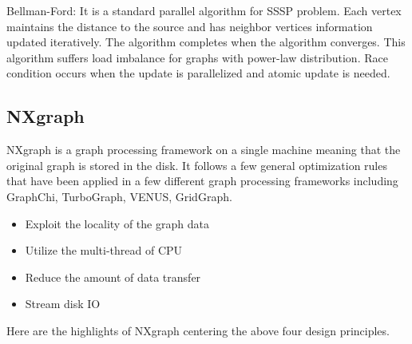 Bellman-Ford: It is a standard parallel algorithm for SSSP problem. Each vertex
maintains the distance to the source and has neighbor vertices information
updated iteratively. The algorithm completes when the algorithm converges. 
This algorithm suffers load imbalance for graphs with power-law distribution.
Race condition occurs when the update is parallelized and atomic update is
needed.

\subsection{NXgraph}
NXgraph \cite{Chi2015NXgraph} is a graph processing framework on a single machine meaning that
the original graph is stored in the disk. It follows a few general optimization
rules that have been applied in a few different graph processing frameworks
including GraphChi, TurboGraph, VENUS, GridGraph. 

\begin{itemize}
    \item Exploit the locality of the graph data
    \item Utilize the multi-thread of CPU
    \item Reduce the amount of data transfer
    \item Stream disk IO
\end{itemize}

Here are the highlights of NXgraph centering the above four design principles.

